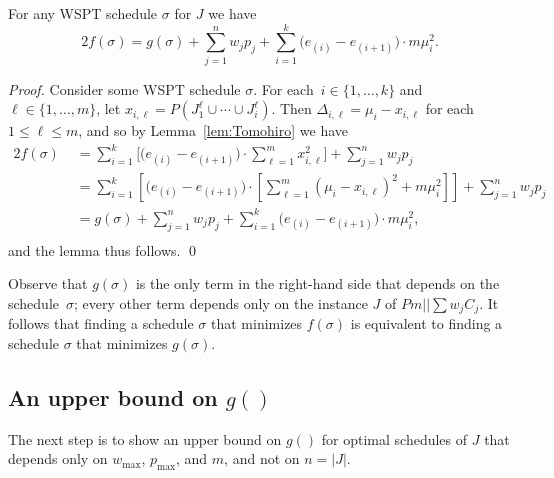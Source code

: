 \documentclass[11pt]{llncs}
\begin{document}
\begin{lemma}
\label{lem:AlternativeForumlation}%
For any WSPT schedule $\sigma$ for $J$ we have
$$
2 f(\sigma) =  g(\sigma) + \sum^n_{j=1} w_j p_j +   \sum_{i = 1}^{k}\big(e_{(i)}-e_{(i+1)}\big)  \cdot m \mu^2_i.
$$
\end{lemma}

\begin{proof}
Consider some WSPT schedule $\sigma$. For each~$i \in \{1,\ldots,k\}$ and $\ell \in \{1,\ldots,m\}$, let $x_{i,\ell} = P(J^\ell_1 \cup \cdots \cup J^\ell_i)$. Then $\Delta_{i,\ell} = \mu_i - x_{i,\ell}$ for each $1 \leq \ell \leq m$, and so by Lemma~\ref{lem:Tomohiro} we have 
\begin{align*}
2 f(\sigma) \,\,&= \sum_{i = 1}^{k}  \Big[ \big(e_{(i)}-e_{(i+1)}\big)  \cdot \sum^m_{\ell=1} x_{i,\ell}^2 \Big] +  \sum^n_{j=1} w_j p_j \\ 
&= \sum_{i = 1}^{k}  \left[ \big(e_{(i)}-e_{(i+1)}\big)   \cdot  \left[ \sum^m_{\ell=1}\left(\mu_i-x_{i,\ell}\right)^2 +m \mu^2_i\right] \right] +  \sum^n_{j=1} w_j p_j\\
&= g(\sigma) + \sum^n_{j=1} w_j p_j +   \sum_{i = 1}^{k}\big(e_{(i)}-e_{(i+1)}\big)  \cdot m \mu^2_i , \\
\end{align*}
and the lemma thus follows. \qed
\end{proof}

Observe that $g(\sigma)$ is the only term in the right-hand side that depends on the schedule~$\sigma$; every other term depends only on the instance $J$ of $Pm|| \sum w_jC_j$. It follows that finding a schedule $\sigma$ that minimizes $f(\sigma)$ is equivalent to finding a schedule $\sigma$ that minimizes $g(\sigma)$. 



\subsection{An upper bound on $g()$}

The next step is to show an upper bound on $g()$ for optimal schedules of $J$ that depends only on $w_{\max}$, $p_{\max}$, and $m$, and not on $n=|J|$.   
\end{document}
